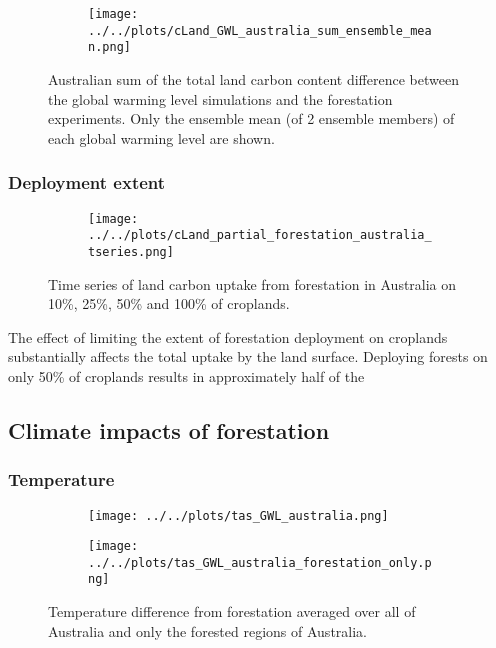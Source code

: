 \documentclass[]{article}
\begin{document}
\begin{figure}[H]
    \centering
    \begin{subfigure}[b]{\linewidth}
        \texttt{[image: ../../plots/cLand\_GWL\_australia\_sum\_ensemble\_mean.png]}
    \end{subfigure}
    \caption{Australian sum of the total land carbon content difference between the global warming level simulations and the forestation experiments. Only the ensemble mean (of 2 ensemble members) of each global warming level are shown.}
    \label{fig:australia_cLand}
\end{figure}

\subsubsection{Deployment extent}

\begin{figure}[H]
    \centering
    \begin{subfigure}[b]{\linewidth}
        \texttt{[image: ../../plots/cLand\_partial\_forestation\_australia\_tseries.png]}
    \end{subfigure}
    \caption{Time series of land carbon uptake from forestation in Australia on 10\%, 25\%, 50\% and 100\% of croplands.}
    \label{fig:australia_cLand_tseries}
\end{figure}

The effect of limiting the extent of forestation deployment on croplands substantially affects the total uptake by the land surface.
Deploying forests on only 50\% of croplands results in approximately half of the 

\subsection{Climate impacts of forestation}

\subsubsection{Temperature}

\begin{figure}[H]
    \centering
    \begin{subfigure}[b]{0.4\linewidth}
        \texttt{[image: ../../plots/tas\_GWL\_australia.png]}
    \end{subfigure}
    \begin{subfigure}[b]{0.4\linewidth}
        \texttt{[image: ../../plots/tas\_GWL\_australia\_forestation\_only.png]}
    \end{subfigure}
    \caption{Temperature difference from forestation averaged over all of Australia and only the forested regions of Australia.}
    \label{fig:tas_australia_timeseries}
\end{figure}
\end{document}
